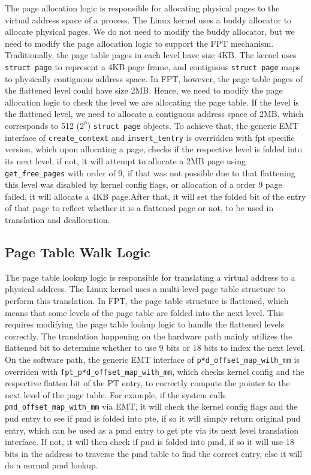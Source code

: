 The page allocation logic is responsible for allocating physical pages to the virtual address space of a process. The Linux kernel uses a buddy allocator to allocate physical pages. We do not need to modify the buddy allocator, but we need to modify the page allocation logic to support the FPT mechanism. Traditionally, the page table pages in each level have size 4KB. The kernel uses \lstinline|struct page| to represent a 4KB page frame, and contiguous \lstinline|struct page| maps to physically contiguous address space. In FPT, however, the page table pages of the flattened level could have size 2MB. Hence, we need to modify the page allocation logic to check the level we are allocating the page table. If the level is the flattened level, we need to allocate a contiguous address space of 2MB, which corresponds to 512 ($2^9$) \lstinline|struct page| objects. To achieve that, the generic EMT interface of \lstinline|create_context| and \lstinline|insert_tentry| is overridden with fpt specific version, which upon allocating a page, checks if the respective level is folded into its next level, if not, it will attempt to allocate a 2MB page using \lstinline|get_free_pages| with order of 9, if that was not possible due to that flattening this level was disabled by kernel config flags, or allocation of a order 9 page failed, it will allocate a 4KB page.After that, it will set the folded bit of the entry of that page to reflect whether it is a flattened page or not, to be used in translation and deallocation.

\subsection{Page Table Walk Logic}

The page table lookup logic is responsible for translating a virtual address to a physical address. The Linux kernel uses a multi-level page table structure to perform this translation. In FPT, the page table structure is flattened, which means that some levels of the page table are folded into the next level. This requires modifying the page table lookup logic to handle the flattened levels correctly. The translation happening on the hardware path mainly utilizes the flattened bit to determine whether to use 9 bits or 18 bits to index the next level. On the software path, the generic EMT interface of \lstinline|p*d_offset_map_with_mm| is overriden with \lstinline|fpt_p*d_offset_map_with_mm|, which checks kernel config and the respective flatten bit of the PT entry, to correctly compute the pointer to the next level of the page table. For example, if the system calls \lstinline|pmd_offset_map_with_mm| via EMT, it will check the kernel config flags and the pud entry to see if pmd is folded into pte, if so it will simply return original pud entry, which can be used as a pmd entry to get pte via its next level translation interface. If not, it will then check if pud is folded into pmd, if so it will use 18 bits in the address to traverse the pmd table to find the correct entry, else it will do a normal pmd lookup.

